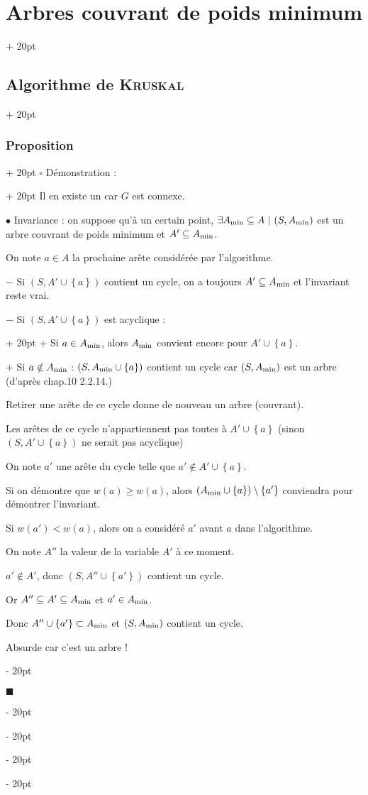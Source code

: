 \documentclass[a4paper, 12pt, twoside]{article}
\newcommand{\set}[1]{\left\{ #1 \right\}}
\renewcommand{\ge}{\geqslant}
\newcommand{\ind}[1][20pt]{\advance\leftskip + #1}
\newcommand{\deind}[1][20pt]{\advance\leftskip - #1}
\newenvironment{indt}[2][20pt]{#2 \par \ind[#1]}{\par \deind} %
\newenvironment{proof}[1][{Démonstration :}]{\begin{indt}{$\square$ #1}}{$\blacksquare$ \end{indt}}
\begin{document}
\begin{indt}{\section{Arbres couvrant de poids minimum}}
\begin{indt}{\subsection{Algorithme de \textsc{Kruskal}}}
\begin{indt}{\subsubsection{Proposition}}
\begin{proof}
                    Il en existe un car $G$ est connexe.

                    \vspace{6pt}
                    
                    $\bullet$ Invariance : on suppose qu'à un certain point, $\exists A_{\rm min} \subseteq A\ |\ (S, A_{\rm min})$ est un arbre couvrant de poids minimum et $A' \subseteq A_{\rm min}$.

                    On note $a \in A$ la prochaine arête considérée par l'algorithme.

                    $-$ Si $(S, A' \cup \set a)$ contient un cycle, on a toujours $A' \subseteq A_{\rm min}$ et l'invariant reste vrai.

                    \begin{indt}{$-$ Si $(S, A' \cup \set a)$ est acyclique :}
                        $+$ Si $a \in A_{\rm min}$, alors $A_{\rm min}$ convient encore pour $A' \cup \set a$.

                        $+$ Si $a \notin A_{\rm min}$ : $(S, A_{\rm min} \cup \set a)$ contient un cycle car $(S, A_{\rm min})$ est un arbre (d'après chap.10 2.2.14.)

                        Retirer une arête de ce cycle donne de nouveau un arbre (couvrant).

                        Les arêtes de ce cycle n'appartiennent pas toutes à $A' \cup \set a$ (sinon $(S, A' \cup \set a)$ ne serait pas acyclique)

                        On note $a'$ une arête du cycle telle que $a' \notin A' \cup \set a$.

                        Si on démontre que $w(a) \ge w(a)$, alors $(A_{\rm min} \cup \set a) \setminus \set{a'}$ conviendra pour démontrer l'invariant.

                        Si $w(a') < w(a)$, alors on a considéré $a'$ avant $a$ dans l'algorithme.

                        On note $A''$ la valeur de la variable $A'$ à ce moment.

                        $a' \notin A'$, donc $(S, A'' \cup \set {a'})$ contient un cycle.

                        Or $A'' \subseteq A' \subseteq A_{\rm min}$ et $a' \in A_{\rm min}$.

                        Donc $A'' \cup \set {a'} \subset A_{\rm min}$ et $(S, A_{\rm min})$ contient un cycle.

                        Absurde car c'est un arbre !
                    \end{indt}


\end{proof}
\end{indt}
\end{indt}
\end{indt}
\end{document}
